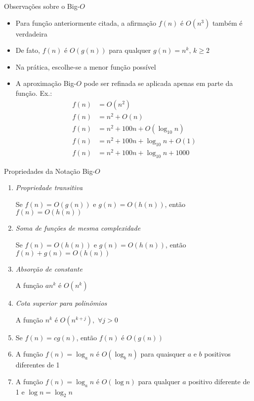 \begin{frame}[fragile]{Observações sobre o Big-$O$}

	\begin{itemize}
		\item Para função anteriormente citada, a afirmação  $f(n)$ é $O(n^3)$ também é verdadeira

		\item De fato, $f(n)$ é $O(g(n))$ para qualquer $g(n)=n^k,\, k \geq 2$ 

		\item Na prática, escolhe-se a menor função possível

		\item A aproximação Big-$O$ pode ser refinada se aplicada apenas em parte da função. Ex.:
        \begin{align*}
            f(n) & = O(n^2) \\
            f(n) & = n^2 + O(n) \\
            f(n) & = n^2 + 100n + O(\log_{10} n) \\
            f(n) & = n^2 + 100n + \log_{10} n + O(1) \\
            f(n) & = n^2 + 100n + \log_{10} n + 1000 
        \end{align*}
	\end{itemize}

\end{frame}

\begin{frame}[fragile]{Propriedades da Notação Big-$O$}

	\begin{enumerate}[\bfseries P1.]
		\item \textit{Propriedade transitiva}

        Se $f(n)=O(g(n))$ e $g(n) = O(h(n))$, então $f(n)=O(h(n))$

		\item \textit{Soma de funções de mesma complexidade}

        Se $f(n)=O(h(n))$ e $g(n)=O(h(n))$, então $f(n)+g(n)=O(h(n))$

		\item \textit{Absorção de constante}

        A função $an^k$ é $O(n^k)$

		\item \textit{Cota superior para polinômios}

        A função $n^k$ é $O(n^{k+j}), \, \, \forall j > 0$

        \item Se $f(n) = cg(n)$, então $f(n)$ é $O(g(n))$

		\item A função $f(n) = \log_a n$ é $O(\log_b n)$ para 
		{quaisquer} $a$ e $b$ {positivos} diferentes de 1

		\item A função $f(n) = \log_a n$ é $O(\log n)$ para 
		{qualquer} $a$ {positivo} diferente de 1 e 
		$\log n = \log_2 n$
	\end{enumerate}

\end{frame}

